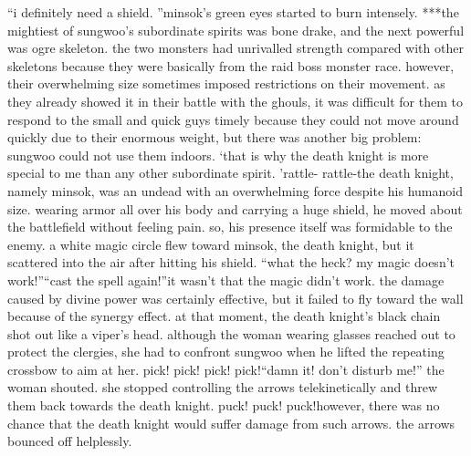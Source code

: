 “i definitely need a shield.
”minsok’s green eyes started to burn intensely.
***the mightiest of sungwoo’s subordinate spirits was bone drake, and the next powerful was ogre skeleton.
the two monsters had unrivalled strength compared with other skeletons because they were basically from the raid boss monster race.
 however, their overwhelming size sometimes imposed restrictions on their movement.
as they already showed it in their battle with the ghouls, it was difficult for them to respond to the small and quick guys timely because they could not move around quickly due to their enormous weight, but there was another big problem: sungwoo could not use them indoors.
‘that is why the death knight is more special to me than any other subordinate spirit.
’rattle- rattle-the death knight, namely minsok, was an undead with an overwhelming force despite his humanoid size.
wearing armor all over his body and carrying a huge shield, he moved about the battlefield without feeling pain.
 so, his presence itself was formidable to the enemy.
a white magic circle flew toward minsok, the death knight, but it scattered into the air after hitting his shield.
“what the heck? my magic doesn’t work!”“cast the spell again!”it wasn’t that the magic didn’t work.
 the damage caused by divine power was certainly effective, but it failed to fly toward the wall because of the synergy effect.
at that moment, the death knight’s black chain shot out like a viper’s head.
although the woman wearing glasses reached out to protect the clergies, she had to confront sungwoo when he lifted the repeating crossbow to aim at her.
pick! pick! pick! pick!“damn it! don’t disturb me!” the woman shouted.
she stopped controlling the arrows telekinetically and threw them back towards the death knight.
puck! puck! puck!however, there was no chance that the death knight would suffer damage from such arrows.
 the arrows bounced off helplessly.


